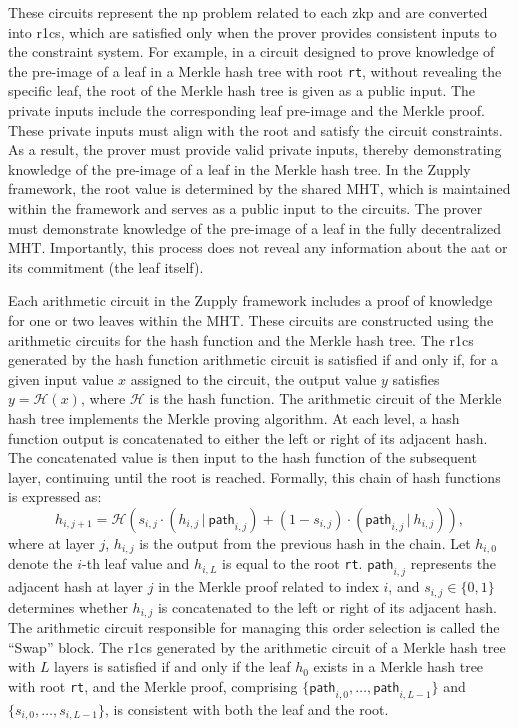 These circuits represent the \gls{np} problem related to each \gls{zkp} and are converted into \gls{r1cs}, which are satisfied only when the prover provides consistent inputs to the constraint system. For example, in a circuit designed to prove knowledge of the pre-image of a leaf in a Merkle hash tree with root \texttt{rt}, without revealing the specific leaf, the root of the Merkle hash tree is given as a public input. The private inputs include the corresponding leaf pre-image and the Merkle proof. These private inputs must align with the root and satisfy the circuit constraints. As a result, the prover must provide valid private inputs, thereby demonstrating knowledge of the pre-image of a leaf in the Merkle hash tree.
In the Zupply framework, the root value is determined by the shared \textsf{MHT}, which is maintained within the framework and serves as a public input to the circuits. The prover must demonstrate knowledge of the pre-image of a leaf in the fully decentralized \textsf{MHT}. Importantly, this process does not reveal any information about the \gls{aat} or its commitment (the leaf itself).



Each arithmetic circuit in the Zupply framework includes a proof of knowledge for one or two leaves within the \textsf{MHT}. These circuits are constructed using the arithmetic circuits for the hash function and the Merkle hash tree. The \gls{r1cs}  generated by the hash function arithmetic circuit is satisfied if and only if, for a given input value $x$ assigned to the circuit, the output value $y$ satisfies $y = \mathcal{H}(x)$, where $\mathcal{H}$ is the hash function.
The arithmetic circuit of the Merkle hash tree implements the Merkle proving algorithm. At each level, a hash function output is concatenated to either the left or right of its adjacent hash. The concatenated value is then input to the hash function of the subsequent layer, continuing until the root is reached. Formally, this chain of hash functions is expressed as:
\[
h_{i,j+1} = \mathcal{H}\left( s_{i,j}\cdot(h_{i,j} \,|\ \textsf{path}_{i,j}) + (1-s_{i,j})\cdot(\textsf{path}_{i,j} \,|\ h_{i,j}) \right),
\]
where at layer $j$, $h_{i,j}$ is the output from the previous hash in the chain. Let $h_{i,0}$ denote the $i$-th leaf value and $h_{i,L}$ is equal to the root \texttt{rt}. $\textsf{path}_{i,j}$ represents the adjacent hash at layer $j$ in the Merkle proof related to index $i$, and $s_{i,j} \in \{0,1\}$ determines whether $h_{i,j}$ is concatenated to the left or right of its adjacent hash. 
The arithmetic circuit responsible for managing this order selection is called the ``Swap'' block. The \gls{r1cs}  generated by the arithmetic circuit of a Merkle hash tree with $L$ layers is satisfied if and only if the leaf $h_0$ exists in a Merkle hash tree with root \texttt{rt}, and the Merkle proof, comprising $\{\textsf{path}_{i,0}, \dots, \textsf{path}_{i,L-1}\}$ and $\{s_{i,0}, \dots, s_{i,L-1}\}$, is consistent with both the leaf and the root.


